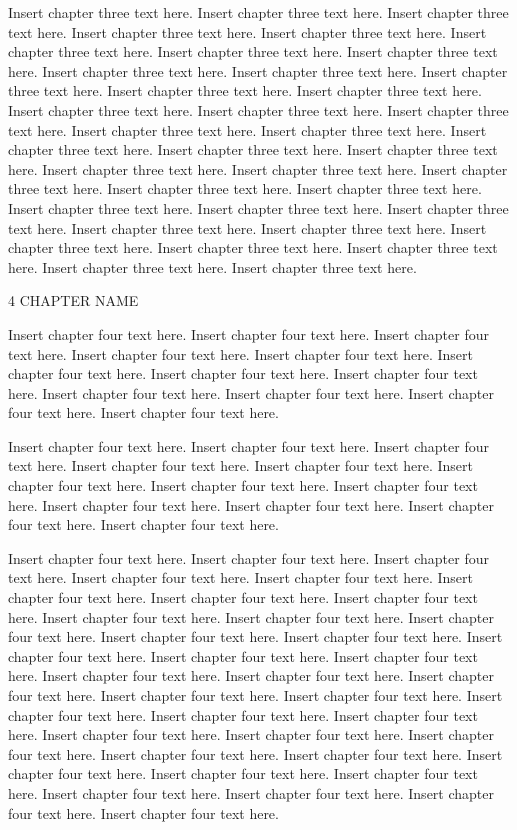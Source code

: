 Insert chapter three text here. Insert chapter three text here. Insert chapter three text here. Insert chapter three text here. Insert chapter three text here. Insert chapter three text here. Insert chapter three text here. Insert chapter three text here. Insert chapter three text here. Insert chapter three text here. Insert chapter three text here. Insert chapter three text here. Insert chapter three text here. Insert chapter three text here. Insert chapter three text here. Insert chapter three text here. Insert chapter three text here. Insert chapter three text here. Insert chapter three text here. Insert chapter three text here. Insert chapter three text here. Insert chapter three text here. Insert chapter three text here. Insert chapter three text here. Insert chapter three text here. Insert chapter three text here. Insert chapter three text here. Insert chapter three text here. Insert chapter three text here. Insert chapter three text here. Insert chapter three text here. Insert chapter three text here. Insert chapter three text here. Insert chapter three text here. Insert chapter three text here. Insert chapter three text here.

4 CHAPTER NAME

Insert chapter four text here. Insert chapter four text here. Insert chapter four text here. Insert chapter four text here. Insert chapter four text here. Insert chapter four text here. Insert chapter four text here. Insert chapter four text here. Insert chapter four text here. Insert chapter four text here. Insert chapter four text here. Insert chapter four text here.

Insert chapter four text here. Insert chapter four text here. Insert chapter four text here. Insert chapter four text here. Insert chapter four text here. Insert chapter four text here. Insert chapter four text here. Insert chapter four text here. Insert chapter four text here. Insert chapter four text here. Insert chapter four text here. Insert chapter four text here.

Insert chapter four text here. Insert chapter four text here. Insert chapter four text here. Insert chapter four text here. Insert chapter four text here. Insert chapter four text here. Insert chapter four text here. Insert chapter four text here. Insert chapter four text here. Insert chapter four text here. Insert chapter four text here. Insert chapter four text here. Insert chapter four text here. Insert chapter four text here. Insert chapter four text here. Insert chapter four text here. Insert chapter four text here. Insert chapter four text here. Insert chapter four text here. Insert chapter four text here. Insert chapter four text here. Insert chapter four text here. Insert chapter four text here. Insert chapter four text here. Insert chapter four text here. Insert chapter four text here. Insert chapter four text here. Insert chapter four text here. Insert chapter four text here. Insert chapter four text here. Insert chapter four text here. Insert chapter four text here. Insert chapter four text here. Insert chapter four text here. Insert chapter four text here. Insert chapter four text here.

